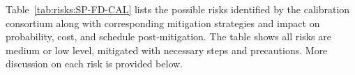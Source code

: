 
Table~\ref{tab:risks:SP-FD-CAL} lists the possible risks identified by the calibration consortium along with corresponding mitigation strategies and impact on probability, cost, and schedule post-mitigation.
The table shows all risks are medium or low level, mitigated with necessary steps and precautions. More discussion on each risk is provided below. 
